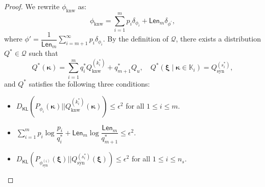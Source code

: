 \documentclass[11pt]{article}
\theoremstyle{plain}
\theoremstyle{definition}
\newcommand{\DKL}{D_{\mathsf{KL}}}
\newcommand{\knwModel}{\phi_{\text{knw}}}
\newcommand{\synModel}{\phi_{\text{syn}}}
\newcommand{\knwfamily}{\mathbf{\Phi_{\text{knw}}}}
\newcommand{\knwcover}{n_{\text{knw}}}
\newcommand{\Len}{\mathsf{Len}}
\newcommand{\Knwelem}{\boldsymbol{\kappa}}
\newcommand{\Synelem}{\boldsymbol{\xi}}
\begin{document}
\begin{proof}
We rewrite $\knwModel$ as:
\[
\knwModel=\sum\limits_{i=1}^m p_i\delta_{\phi_i}+\Len_m\delta_{\phi^{\prime}},
\]
where $\phi'=\dfrac{1}{\Len_m}\sum\limits_{i=m+1}^{\infty}p_i\delta_{\phi_i}$.
By the definition of $\mathcal{Q}$, there exists a distribution $Q^*\in\mathcal{Q}$ such that
\[
Q^*(\Knwelem)=\sum\limits_{i=1}^{m} q^*_i Q_{\text{knw}}^{(k^*_i)}+q_{m+1}^* Q_u,\quad
Q^*(\Synelem\mid \Knwelem\in \mathbb{K}_i)=Q_{\text{syn}}^{(s^*_i)},
\]
and $Q^*$ satisfies the following three conditions:
\begin{itemize}
    \item $\DKL(P_{\phi_i}(\Knwelem)||Q_{\text{knw}}^{(k^*_i)}(\Knwelem))\le \epsilon^2$ for all $1\le i\le m$.
    \item $\sum\limits_{i=1}^{m}p_i\log \dfrac{p_i}{q^*_i}+\Len_m\log\dfrac{\Len_m}{q^*_{m+1}}\le \epsilon^2.$
    \item $\DKL(P_{\synModel^{(i)}}(\Synelem)||Q_{\text{syn}}^{(s^*_i)}(\Synelem))\le \epsilon^2$ for all $1\le i\le n_s$.
\end{itemize}


\end{proof}
\end{document}
